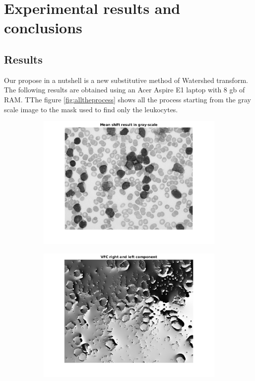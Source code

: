 \chapter{Experimental results and conclusions}
\section{Results}
Our propose in a nutshell is a new substitutive method of Watershed transform. The following results are obtained using an Acer Aspire E1 laptop with 8 gb of RAM. TThe figure \ref{fig:alltheprocess} shows all the process starting from the gray scale image to the mask used to find only the leukocytes.
\begin{figure}[htbp]
    \centering
    \begin{subfigure}[b]{0.45\textwidth}
        \includegraphics[width=\textwidth]{img/final/figure1.png}
        \caption{ }
        \label{fig:fig1}
    \end{subfigure}
    \begin{subfigure}[b]{0.45\textwidth}
        \includegraphics[width=\textwidth]{img/final/figure2.png}

\end{subfigure}
\end{figure}
